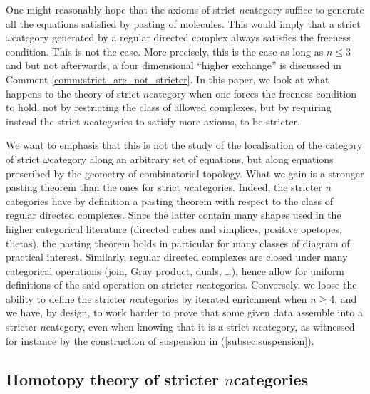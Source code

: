 One might reasonably hope that the axioms of strict \( n \)\nbd category suffice to generate all the equations satisfied by pasting of molecules.
This would imply that a strict \( \omega \)\nbd category generated by a regular directed complex always satisfies the freeness condition. 
This is not the case.
More precisely, this is the case as long as \( n \le 3 \) and but not afterwards, a four dimensional ``higher exchange'' is discussed in Comment \ref{comm:strict_are_not_stricter}.
In this paper, we look at what happens to the theory of strict \( n \)\nbd category when one forces the freeness condition to hold, not by restricting the class of allowed complexes, but by requiring instead the strict \( n \)\nbd categories to satisfy more axioms, to be stricter.

We want to emphasis that this is not the study of the localisation of the category of strict \( \omega \)\nbd category along an arbitrary set of equations, but along equations prescribed by the geometry of combinatorial topology.
What we gain is a stronger pasting theorem than the ones for strict \( n \)\nbd categories.
Indeed, the stricter \( n \)\nbd categories have by definition a pasting theorem with respect to the class of regular directed complexes. 
Since the latter contain many shapes used in the higher categorical literature (directed cubes and simplices, positive opetopes, thetas), the pasting theorem holds in particular for many classes of diagram of practical interest.   
Similarly, regular directed complexes are closed under many categorical operations (join, Gray product, duals, \dots), hence allow for uniform definitions of the said operation on stricter \( n \)\nbd categories.
Conversely, we loose the ability to define the stricter \( n \)\nbd categories by iterated enrichment when \( n \geq 4 \), and we have, by design, to work harder to prove that some given data assemble into a stricter \( n \)\nbd category, even when knowing that it is a strict \( n \)\nbd category, as witnessed for instance by the construction of suspension in (\ref{subsec:suspension}). 

\subsection*{Homotopy theory of stricter \( n \)\nbd categories}

